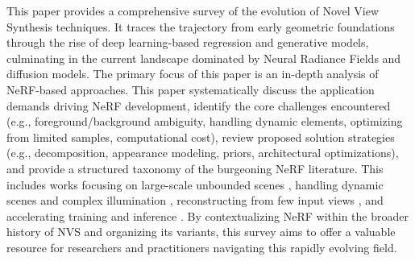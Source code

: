 This paper provides a comprehensive survey of the evolution of Novel View Synthesis techniques. It traces the trajectory from early geometric foundations through the rise of deep learning-based regression and generative models, culminating in the current landscape dominated by Neural Radiance Fields and diffusion models. The primary focus of this paper is an in-depth analysis of NeRF-based approaches. This paper systematically discuss the application demands driving NeRF development, identify the core challenges encountered (e.g., foreground/background ambiguity, handling dynamic elements, optimizing from limited samples, computational cost), review proposed solution strategies (e.g., decomposition, appearance modeling, priors, architectural optimizations), and provide a structured taxonomy of the burgeoning NeRF literature. This includes works focusing on large-scale unbounded scenes \cite{barron2022mipnerf360, turki2022mega}, handling dynamic scenes and complex illumination \cite{martinbrualla2021nerfw, tancik2022blocknerf}, reconstructing from few input views \cite{chen2021mvsnerf, jain2021dietnerf, yang2023freenerf}, and accelerating training and inference \cite{yu2021plenoctrees, fridovichkeil2022plenoxels, mueller2022instant}. By contextualizing NeRF within the broader history of NVS and organizing its variants, this survey aims to offer a valuable resource for researchers and practitioners navigating this rapidly evolving field.